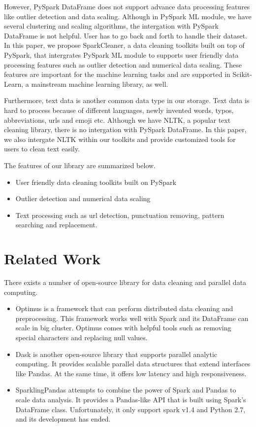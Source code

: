 \documentclass[sigconf]{acmart}
\begin{document}
However, PySpark DataFrame does not support advance data processing features like outlier detection and data scaling. Although in PySpark ML module, we have several clustering and scaling algorithms, the intergation with PySpark DataFrame is not helpful. User has to go back and forth to handle their dataset.  In this paper, we propose SparkCleaner, a data cleaning toolkits built on top of PySpark, that intergrates PySpark ML module to supports user friendly data processing features such as outlier detection and numerical data scaling. These features are important for the machine learning tasks and are supported in Scikit-Learn\cite{scikit-learn}, a mainstream machine learning library, as well.
	
Furthermore, text data is another common data type in our storage. Text data is hard to process because of different languages, newly invented words, typos, abbreviations, urls and emoji etc. Although we have NLTK\cite{nltk}, a popular text cleaning library, there is no intergation with PySpark DataFrame. In this paper, we also intergate NLTK within our toolkits and provide customized tools for users to clean text easily. 
	
The features of our library are summarized below.
\begin{itemize}
	\item{User friendly data cleaning toolkits built on PySpark}
	\item{Outlier detection and numerical data scaling}
	\item{Text processing such as url detection, punctuation removing, pattern searching and replacement. }
\end{itemize}	

\section{Related Work}
There exists a number of open-source library for data cleaning and parallel data computing. 
\begin{itemize}
	\item{Optimus}\cite{optimus} is a framework that can perform distributed data cleaning and preprocessing. This framework works well with Spark and its DataFrame can scale in big cluster. Optimus comes with helpful tools such as removing special characters and replacing null values.
	\item{Dask}\cite{dask} is another open-source library that supports parallel analytic computing. It provides scalable parallel data structures that extend interfaces like Pandas. At the same time, it offers low latency and high responsiveness.
	\item{SparklingPandas}\cite{sparklingpandas} attempts to combine the power of Spark and Pandas to scale data analysis. It provides a Pandas-like API that is built using Spark's DataFrame class. Unfortunately, it only support spark v1.4 and Python 2.7, and its development has ended.
\end{itemize}
\end{document}
